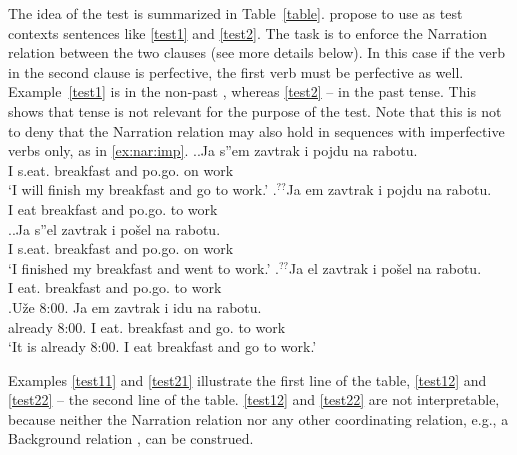 The idea of the test is summarized in Table~\ref{table}. \citet{ZinovaFilip:13} propose to use as test contexts   sentences like \ref{test1} and \ref{test2}. The task is to enforce the Narration relation   between the two clauses (see more details below). In this case if the verb in the second clause is perfective, the first verb must be perfective as well. Example~\ref{test1} is in the non-past  , whereas \ref{test2} -- in the past  tense. This shows that tense is not relevant for the purpose of the test. Note that this is not to deny that the Narration relation  may also hold in sequences with imperfective verbs  only, as in \ref{ex:nar:imp}.
\ex.\label{test1}\ag.\label{test11}Ja s''em\textsuperscript{\PF} zavtrak i pojdu\textsuperscript{\PF} na rabotu.\\
I s.eat. breakfast and po.go. on work\\
\trans `I will finish my breakfast and go to work.'
\bg.\label{test12}$^{??}$Ja em\textsuperscript{\IPF} zavtrak i pojdu\textsuperscript{\PF} na rabotu.\\ 
I eat breakfast and po.go. to work\\

\ex.\label{test2}\ag.\label{test21}Ja s''el\textsuperscript{\PF} zavtrak i po\v{s}el\textsuperscript{\PF} na rabotu.\\
I s.eat. breakfast and po.go. on work\\
\trans `I finished my breakfast and went to work.'
\bg.\label{test22}$^{??}$Ja el\textsuperscript{\IPF} zavtrak i po\v{s}el\textsuperscript{\PF} na rabotu.\\
I eat. breakfast and po.go. to work\\

\exg.\label{ex:nar:imp}U\v{z}e 8:00. Ja em\textsuperscript{\IPF} zavtrak i idu\textsuperscript{\IPF} na rabotu.\\
already 8:00. I eat. breakfast and go. to work\\
\trans `It is already 8:00. I eat breakfast and go to work.'

Examples \ref{test11} and \ref{test21} illustrate the first line of the table, \ref{test12} and \ref{test22} -- the second line of the table. \ref{test12} and \ref{test22} are not interpretable, because neither the Narration relation  nor any other coordinating relation, e.g., a Background relation , can be construed. 

